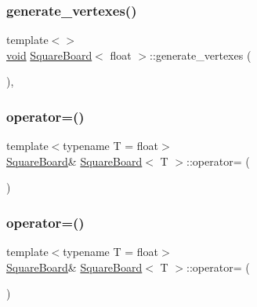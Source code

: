 \subsubsection{\texorpdfstring{generate\+\_\+vertexes()}{generate\_vertexes()}\hspace{0.1cm}{\footnotesize\ttfamily [4/4]}}
{\footnotesize\ttfamily template$<$$>$ \\
\mbox{\hyperlink{glad_8h_a950fc91edb4504f62f1c577bf4727c29}{void}} \mbox{\hyperlink{classSquareBoard}{Square\+Board}}$<$ float $>$\+::generate\+\_\+vertexes (\begin{DoxyParamCaption}{ }\end{DoxyParamCaption})\hspace{0.3cm}{\ttfamily [inline]}, {\ttfamily [private]}}

\mbox{\label{classSquareBoard_a354794a6de9edec8c771ca49dd315acf}} 
\subsubsection{\texorpdfstring{operator=()}{operator=()}\hspace{0.1cm}{\footnotesize\ttfamily [1/4]}}
{\footnotesize\ttfamily template$<$typename T  = float$>$ \\
\mbox{\hyperlink{classSquareBoard}{Square\+Board}}\& \mbox{\hyperlink{classSquareBoard}{Square\+Board}}$<$ T $>$\+::operator= (\begin{DoxyParamCaption}\item[{\mbox{\hyperlink{classSquareBoard}{Square\+Board}}$<$ T $>$ \&\&}]{ }\end{DoxyParamCaption})\hspace{0.3cm}{\ttfamily [default]}}

\mbox{\label{classSquareBoard_a354794a6de9edec8c771ca49dd315acf}} 
\subsubsection{\texorpdfstring{operator=()}{operator=()}\hspace{0.1cm}{\footnotesize\ttfamily [2/4]}}
{\footnotesize\ttfamily template$<$typename T  = float$>$ \\
\mbox{\hyperlink{classSquareBoard}{Square\+Board}}\& \mbox{\hyperlink{classSquareBoard}{Square\+Board}}$<$ T $>$\+::operator= (\begin{DoxyParamCaption}\item[{\mbox{\hyperlink{classSquareBoard}{Square\+Board}}$<$ T $>$ \&\&}]{ }\end{DoxyParamCaption})\hspace{0.3cm}{\ttfamily [default]}}

